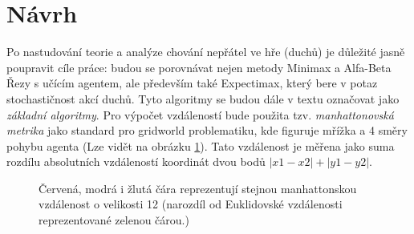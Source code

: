 \section{Návrh}
\label{navrh}
Po nastudování teorie a analýze chování nepřátel ve hře (duchů) je důležité jasně poupravit cíle práce: budou se porovnávat nejen metody Minimax a Alfa-Beta Řezy s učícím agentem, ale především také Expectimax, který bere v potaz stochastičnost akcí duchů. Tyto algoritmy se budou dále v textu označovat jako \textit{základní algoritmy}.
\newline
Pro výpočet vzdáleností bude použita tzv. \textit{manhattonovská metrika} \cite{manhattanDist} jako standard pro gridworld problematiku, kde figuruje mřížka a 4 směry pohybu agenta (Lze vidět na obrázku \ref{img:manhattanDist}). Tato vzdálenost je měřena jako suma rozdílu absolutních vzdáleností koordinát dvou bodů $\left|x1-x2\right|+\left|y1-y2\right|$.

\begin{figure}[!htbp]
\begin{center}
  \caption{Červená, modrá i žlutá čára reprezentují stejnou manhattonskou vzdálenost o velikosti 12 (narozdíl od Euklidovské vzdálenosti reprezentované zelenou čárou.)}
  \label{img:manhattanDist}
\end{center}
\end{figure}

